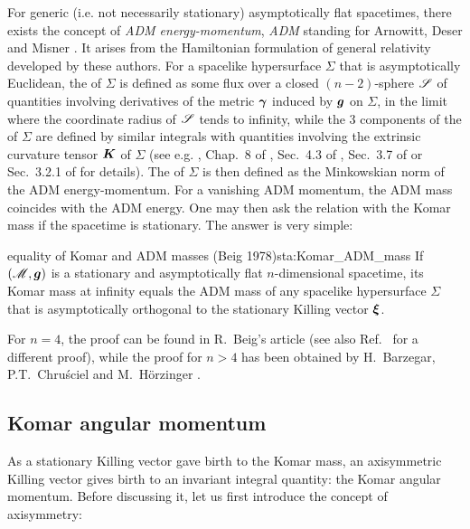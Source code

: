 For generic (i.e. not necessarily stationary) asymptotically flat spacetimes,
there exists the concept of \emph{ADM energy-momentum}, \emph{ADM} standing for
Arnowitt, Deser and Misner \cite{ArnowDM62}. It arises from the Hamiltonian
formulation of general relativity developed by these authors.
For a spacelike hypersurface $\Sigma$ that is asymptotically Euclidean,
the  of $\Sigma$ is defined
as some flux over a closed $(n-2)$-sphere $\mathscr{S}$ of quantities involving derivatives
of the metric $\bm{\gamma}$ induced by $\bm{g}$ on $\Sigma$, in the limit where
the coordinate radius of $\mathscr{S}$ tends to infinity, while the
3 components of the 
of $\Sigma$ are defined by similar integrals with quantities involving the extrinsic curvature
tensor $\bm{K}$ of $\Sigma$ (see e.g. \cite{JaramG11},
Chap.~8 of \cite{Gourg12}, Sec.~4.3 of \cite{Poiss04},
Sec.~3.7 of \cite{Strau13} or Sec.~3.2.1 of \cite{Szaba09} for details).
The  of $\Sigma$
is then defined as the Minkowskian norm of the ADM energy-momentum.
For a vanishing ADM momentum, the ADM mass coincides with the ADM energy.
One may then ask the relation with the Komar mass if the spacetime is stationary.
The answer is very simple:
\begin{tprop}{equality of Komar and ADM masses \textnormal{(Beig 1978)}}{sta:Komar_ADM_mass}
If $(\mathscr{M},\bm{g})$ is a stationary and asymptotically flat $n$-dimensional spacetime,
its Komar mass at infinity equals the ADM mass of any spacelike hypersurface
$\Sigma$ that is asymptotically orthogonal to the stationary Killing vector $\bm{\xi}$.
\end{tprop}
For $n=4$, the proof can be found in R.~Beig's article \cite{Beig78}
(see also Ref.~\cite{AshteM79} for a different proof), while the proof
for $n>4$ has been obtained by H.~Barzegar, P.T.~Chruściel and M.~Hörzinger \cite{BarzgCH17}.

\subsection{Komar angular momentum} \label{s:sta:Komar_angu_mom}

As a stationary Killing vector gave birth to the Komar mass,
an axisymmetric Killing vector gives birth to an invariant integral quantity:
the Komar angular momentum. Before discussing it, let us first introduce
the concept of axisymmetry:

